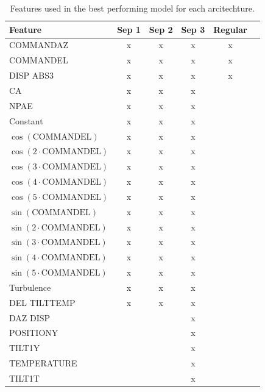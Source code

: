 \begin{table}[!htbp]
    \centering
    \caption{Features used in the best performing model for each arcitechture.}
    \begin{tabular}{|l|ccccc|}
        \hline
        Feature & Sep 1 & Sep 2 & Sep 3 & Regular & \\ \hline
        COMMANDAZ & x & x & x & x & \\ \hline
        COMMANDEL & x & x & x & x & \\ \hline
        DISP ABS3 & x & x & x & x & \\ \hline
        CA & x & x & x & & \\ \hline
        NPAE & x & x & x & & \\ \hline
        Constant & x & x & x & & \\ \hline
        $\cos{(\text{COMMANDEL})}$ & x & x & x & & \\ \hline
        $\cos{(2\cdot \text{COMMANDEL})}$ & x & x & x & & \\ \hline
        $\cos{(3\cdot \text{COMMANDEL})}$ & x & x & x & & \\ \hline
        $\cos{(4\cdot \text{COMMANDEL})}$ & x & x & x & & \\ \hline
        $\cos{(5\cdot \text{COMMANDEL})}$ & x & x & x & & \\ \hline
        $\sin{(\text{COMMANDEL})}$ & x & x & x & & \\ \hline
        $\sin{(2 \cdot \text{COMMANDEL})}$ & x & x & x & & \\ \hline
        $\sin{(3 \cdot \text{COMMANDEL})}$ & x & x & x & & \\ \hline
        $\sin{(4 \cdot \text{COMMANDEL})}$ & x & x & x & & \\ \hline
        $\sin{(5 \cdot \text{COMMANDEL})}$ & x & x & x & & \\ \hline
        Turbulence & x & x & x & & \\ \hline
        DEL TILTTEMP & x & x & x & & \\ \hline
        DAZ DISP & & & x & & \\ \hline
        POSITIONY & & & x & & \\ \hline
        TILT1Y & & & x & & \\ \hline
        TEMPERATURE & & & x & & \\ \hline
        TILT1T & & & x & & \\ \hline
    \end{tabular}
    \label{tab:exp1_features}
\end{table}

\newpage




